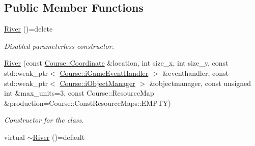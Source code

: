 \subsection*{Public Member Functions}
\begin{DoxyCompactItemize}
\item 
\hypertarget{class_student_1_1_river_a3f3453fb4bcfb61fa9125e491ab1fc53}{\hyperlink{class_student_1_1_river_a3f3453fb4bcfb61fa9125e491ab1fc53}{River} ()=delete}\label{class_student_1_1_river_a3f3453fb4bcfb61fa9125e491ab1fc53}

\begin{DoxyCompactList}\small\item\em Disabled parameterless constructor. \end{DoxyCompactList}\item 
\hyperlink{class_student_1_1_river_a1c8f0fbd92233816e5a54310272cb8ef}{River} (const \hyperlink{class_course_1_1_coordinate}{Course\-::\-Coordinate} \&location, int size\-\_\-x, int size\-\_\-y, const std\-::weak\-\_\-ptr$<$ \hyperlink{class_course_1_1i_game_event_handler}{Course\-::i\-Game\-Event\-Handler} $>$ \&eventhandler, const std\-::weak\-\_\-ptr$<$ \hyperlink{class_course_1_1i_object_manager}{Course\-::i\-Object\-Manager} $>$ \&objectmanager, const unsigned int \&max\-\_\-units=3, const Course\-::\-Resource\-Map \&production=Course\-::\-Const\-Resource\-Maps\-::\-E\-M\-P\-T\-Y)
\begin{DoxyCompactList}\small\item\em Constructor for the class. \end{DoxyCompactList}\item 
\hypertarget{class_student_1_1_river_aeea36cb215f00e260ae4ceed50cc4764}{virtual \hyperlink{class_student_1_1_river_aeea36cb215f00e260ae4ceed50cc4764}{$\sim$\-River} ()=default}\label{class_student_1_1_river_aeea36cb215f00e260ae4ceed50cc4764}


\end{DoxyCompactItemize}
